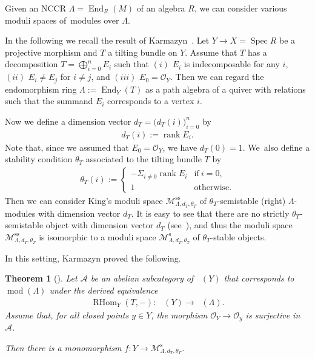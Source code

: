 \documentclass[10pt,a4paper]{amsart}
\DeclareMathOperator{\D}{D^b}
\DeclareMathOperator{\End}{End}
\DeclareMathOperator{\modu}{mod}
\DeclareMathOperator{\rank}{rank}
\DeclareMathOperator{\RHom}{RHom}
\DeclareMathOperator{\Spec}{Spec}
\newcommand{\stsh}{\mathcal{O}}
\numberwithin{equation}{section}
\newtheorem{Theorem}{Theorem}[section]
\begin{document}
Given an NCCR $\Lambda = \End_R(M)$ of an algebra $R$,
we can consider various moduli spaces of~modules over $\Lambda$.

In the following we recall the result of Karmazyn~\cite{Kar17}.
Let $Y \to X = \Spec R$ be a projective morphism and $T$ a tilting bundle on $Y$.
Assume that $T$ has a decomposition $T = \bigoplus_{i=0}^n E_i$
such that $(i)$ $E_i$ is indecomposable for any $i$, $(ii)$ $E_i \neq E_j$ for $i \neq j$, and $(iii)$ $E_0 = \stsh_Y$.
Then we can regard the endomorphism ring $\Lambda := \End_Y(T)$ as a path algebra of a quiver with relations
such that the summand $E_i$ corresponds to a vertex $i$.

Now we define a dimension vector $d_T = \big(d_T(i)\big)_{i = 0}^n$ by
\begin{gather*}
d_T(i) := \rank E_i.
\end{gather*}
Note that, since we assumed that $E_0 = \stsh_Y$, we have $d_T(0) = 1$.
We~also define a stability condition $\theta_T$ associated to the tilting bundle $T$ by
\begin{gather*}
\theta_T(i) := \begin{cases}
- \Sigma_{i \neq 0} \rank E_i & \text{if} \  i = 0, \\
1 & \text{otherwise.}
\end{cases}
\end{gather*}
Then we can consider King's moduli space $\mathcal{M}_{\Lambda, d_T, \theta_T}^{\mathrm{ss}}$
of $\theta_T$-semistable (right) $\Lambda$-modules with dimension vector $d_T$.
It is easy to see that there are no strictly $\theta_T$-semistable object with dimension vector $d_T$ (see~\cite{Kar17}),
and thus the moduli space $\mathcal{M}_{\Lambda, d_T, \theta_T}^{\mathrm{ss}}$ is isomorphic to a moduli space
$\mathcal{M}_{\Lambda, d_T, \theta_T}^{\mathrm{s}}$ of $\theta_T$-stable objects.

In this setting, Karmazyn proved the following.

\begin{Theorem}[{\cite[Corollary 5.1.5]{Kar17}}] \label{Karmazyn moduli}
Let $\mathcal{A}$ be an abelian subcategory of $\D(Y)$ that corresponds to $\modu(\Lambda)$ under the derived equivalence
\begin{gather*}
\RHom_Y(T,-)\colon \ \D(Y) \to \D(\Lambda).
\end{gather*}
Assume that, for all closed points $y \in Y$, the morphism $\stsh_Y \to \stsh_y$ is surjective in $\mathcal{A}$.

Then there is a monomorphism $f\colon Y \to \mathcal{M}_{\Lambda, d_T, \theta_T}^{\mathrm{s}}$.
\end{Theorem}
\end{document}
